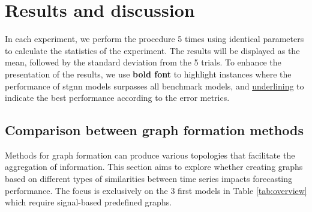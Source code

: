 \section{Results and discussion}

In each experiment, we perform the procedure 5 times using identical parameters to calculate the statistics of the experiment. The results will be displayed as the mean, followed by the standard deviation from the 5 trials. To enhance the presentation of the results, we use \textbf{bold font} to highlight instances where the performance of \acrshort{stgnn} models surpasses all benchmark models, and \underline{underlining} to indicate the best performance according to the error metrics.


\subsection{Comparison between graph formation methods}\label{subsubsec:graph_formation}
Methods for graph formation can produce various topologies that facilitate the aggregation of information. This section aims to explore whether creating graphs based on different types of similarities between time series impacts forecasting performance. The focus is exclusively on the 3 first models in Table \ref{tab:overview} which require signal-based predefined graphs.
